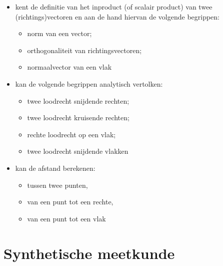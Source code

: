 \documentclass[12pt,twoside]{article}
\begin{document}
\begin{theorie}
{\begin{itemize}
\begin{itemize}
      \item rechte die een vlak in een punt snijdt.
    \end{itemize}
    \item kent de definitie van het inproduct (of scalair product) van twee (richtings)vectoren en aan de hand hiervan de volgende begrippen:
    \begin{itemize}
    \itemsep-0.5em
  \vspace*{-0.2cm}
      \item norm van een vector;
      \item orthogonaliteit van richtingsvectoren;
      \item normaalvector van een vlak
    \end{itemize}
    \item kan de volgende begrippen analytisch vertolken:
    \begin{itemize}
    \itemsep-0.5em
  \vspace*{-0.2cm}
      \item twee loodrecht snijdende rechten;
      \item twee loodrecht kruisende rechten;
      \item rechte loodrecht op een vlak;
      \item twee loodrecht snijdende vlakken
    \end{itemize}
    \item kan de afstand berekenen:
    \begin{itemize}
    \itemsep-0.5em
  \vspace*{-0.2cm}
      \item tussen twee punten,
      \item van een punt tot een rechte,
      \item van een punt tot een vlak
    \end{itemize}
    \end{itemize}}

  \thispagestyle{empty}
  \mbox{}
  \newpage
  \clearpage
  \thispagestyle{empty}
  \tableofcontents
  \newpage
  \clearpage

  \fancyhead[RE,LO]{}

\end{theorie}

\section{Synthetische meetkunde}
\end{document}
